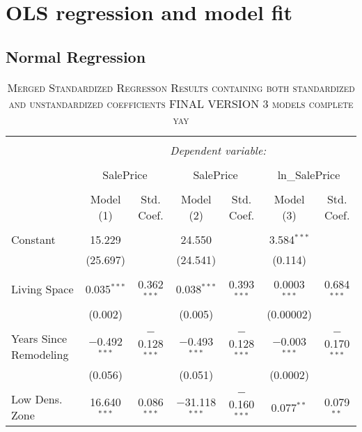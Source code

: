 \documentclass[a4paper]{article}
\begin{document}
\section{OLS regression and model fit}
\subsection{Normal Regression}

\begin{table}[!htbp] \centering 
\begin{adjustwidth}{0.5cm}{-0cm}
\begin{threeparttable}
\small
\captionsetup{font=small, justification=raggedright,singlelinecheck=false}
\caption{\textsc{Merged Standardized Regresson Results containing both standardized and unstandardized coefficients FINAL VERSION 3 models complete yay}}
\centering 
  \label{}
\small 
\begin{tabular}{@{\extracolsep{-7pt}}lcccccc} 
\\[-5.8ex]\hline 
\hline \\[-1.8ex] 
 & \multicolumn{6}{c}{\textit{Dependent variable:}} \\ 
\cline{2-7} 
\\[-1.8ex] & \multicolumn{2}{c}{SalePrice} & \multicolumn{2}{c}{SalePrice} & \multicolumn{2}{c}{ln\_SalePrice} \\ 
\\[-1.8ex] & Model (1) & Std. Coef.& Model (2) & Std. Coef.&  Model (3) & Std. Coef.\\ 
\hline \\[-1.8ex] 
 Constant & 15.229 &  & 24.550 &  & 3.584$^{***}$ &  \\ 
  & (25.697) &  & (24.541) &  & (0.114) & \\ 
  & & & & & & \\ 
 Living Space & 0.035$^{***}$ & 0.362$^{***}$ & 0.038$^{***}$ & 0.393$^{***}$ & 0.0003$^{***}$ & 0.684$^{***}$ \\ 
  & (0.002) & & (0.005) & & (0.00002) &  \\ 
  & & & & & & \\ 
 Years Since Remodeling & $-$0.492$^{***}$ & $-$0.128$^{***}$ & $-$0.493$^{***}$ & $-$0.128$^{***}$ & $-$0.003$^{***}$ & $-$0.170$^{***}$ \\ 
  & (0.056) &  & (0.051) &  & (0.0002) &  \\ 
  & & & & & & \\ 
 Low Dens. Zone & 16.640$^{***}$ & 0.086$^{***}$ & $-$31.118$^{***}$ & $-$0.160$^{***}$ & 0.077$^{**}$ & 0.079$^{**}$ \\ 

\end{tabular}
\end{threeparttable}
\end{adjustwidth}
\end{table}
\end{document}
